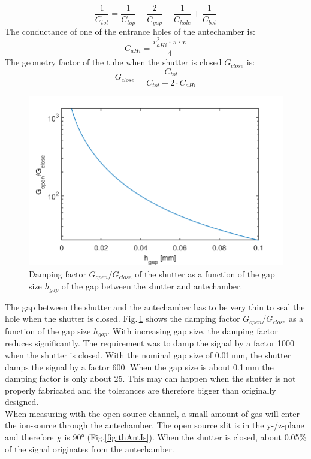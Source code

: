		\begin{equation}
			\frac{1}{C_{tot}} = \frac{1}{C_{top}} + \frac{2}{C_{gap}} + \frac{1}{C_{hole}} + \frac{1}{C_{bot}}
		\end{equation}
		The conductance of one of the entrance holes of the antechamber is:
		\begin{equation}
			C_{aHi} = \frac{r_{aHi}^2\cdot\pi\cdot\bar{v}}{4}
		\end{equation}
		The geometry factor of the tube when the shutter is closed $G_{close}$ is:
		\begin{equation}
			G_{close} = \frac{C_{tot}}{C_{tot} + 2\cdot C_{aHi}}
		\end{equation}
		\begin{figure}[h]
			\centering
			\includegraphics[width=.8\textwidth]{Bilder/ShutGapSizeSigDamp.png}
			\caption{Damping factor $G_{open}/G_{close}$ of the shutter as a function of the gap size $h_{gap}$ of the gap between the shutter and antechamber.}
			\label{fig:ShutGapSizeSigDamp}
		\end{figure}
		The gap between the shutter and the antechamber has to be very thin to seal the hole when the shutter is closed. Fig.\,\ref{fig:ShutGapSizeSigDamp} shows the damping factor $G_{open}/G_{close}$ as a function of the gap size $h_{gap}$. With increasing gap size, the damping factor reduces significantly. The requirement was to damp the signal by a factor 1000 when the shutter is closed. With the nominal gap size of 0.01\,mm, the shutter damps the signal by a factor 600. When the gap size is about 0.1\,mm the damping factor is only about 25. This may can happen when the shutter is not properly fabricated and the tolerances are therefore bigger than originally designed.\\
		When measuring with the open source channel, a small amount of gas will enter the ion-source through the antechamber. The open source slit is in the y-/z-plane and therefore $\chi$ is 90\si{\degree} (Fig.\ref{fig:thAntIs}). When the shutter is closed, about 0.05\% of the signal originates from the antechamber.
		
